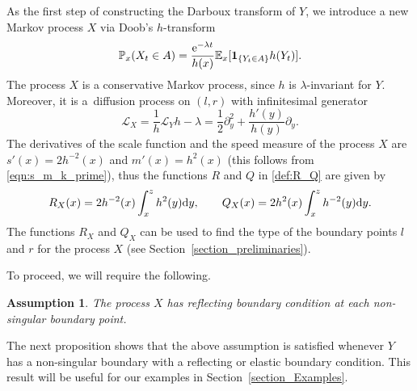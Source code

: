 \documentclass[pdftex]{sigma}
\numberwithin{equation}{section}
\newtheorem{Assumption}[Theorem]{Assumption}
\theoremstyle{definition}
\def\L{{\mathcal L}}
\def\p{{\mathbb P}}
\def\e{{\mathbb E}}
\def\d{{\textnormal d}}
\begin{document}
As the first step of constructing the Darboux transform of $Y$, we introduce a new Markov process $X$ via Doob's $h$-transform
\begin{equation}\label{X_as_Doobs_transform}
\p_x (X_t \in A)=\frac{{\rm e}^{-\lambda t}}{h(x)}
\e_x[ {\mathbf 1}_{\{Y_t \in A\}} h(Y_t)].
\end{equation}
The process $X$ is a conservative Markov process, since $h$ is $\lambda$-invariant for $Y$. Moreover, it is a~diffusion process on $(l,r)$ with infinitesimal generator
\begin{equation}\label{eqn:L_X}
\L_X=\frac{1}{h} \L_Y h-\lambda=\frac{1}{2} \partial_y^2 + \frac{h'(y)}{h(y)} \partial_y.
\end{equation}
The derivatives of the scale function and the speed measure of the process $X$ are $s'(x)=2h^{-2}(x)$ and $m'(x)=h^2(x)$ (this follows from \eqref{eqn:s_m_k_prime}), thus the functions $R$ and $Q$ in \eqref{def:R_Q} are given by
\begin{equation}\label{R_X_Q_X}
R_X(x)=2 h^{-2}(x) \int_x^z h^2(y) \d y, \qquad
Q_X(x)=2 h^{2}(x) \int_x^z h^{-2}(y) \d y.
\end{equation}
The functions $R_X$ and $Q_X$ can be used to find the type of the boundary points $l$ and $r$ for the process $X$ (see Section~\ref{section_preliminaries}).

To proceed, we will require the following.
\begin{Assumption}\label{Assumption_2}
The process $X$ has reflecting boundary condition at each non-singular boundary point.
\end{Assumption}

The next proposition shows that the above assumption is satisfied whenever $Y$ has a non-singular boundary with a reflecting or elastic boundary condition. This result will be useful for our examples in Section~\ref{section_Examples}.
\end{document}
